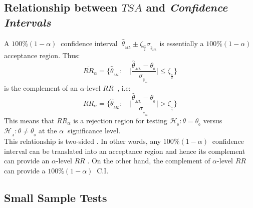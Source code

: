 \documentclass[14pt,twoside,a4paper,fleqn]{article}
\theoremstyle{plain}
\begin{document}
\subsection{Relationship between $TSA$ and \emph{Confidence Intervals}}
A $100\%(1-\alpha)\ $ confidence interval $\ \hat{\theta}_{_{ML}}\pm \zeta_{\frac{\alpha}{2}}\sigma_{_{\hat{\theta}_{ML}}}$ is essentially a $100\%(1-\alpha)\ $ acceptance region. Thus:
$$
	\overline{RR}_\alpha = \big\{ \hat{\theta}_{_{ML}}\colon\ \ \ \  \big| \frac{\hat{\theta}_{_{ML}}-\theta_{_0}}{\sigma_{_{\hat{\theta}_{_{ML}}}}} \big| \leq \zeta_{_{\frac{\alpha}{2}}} \big\}
$$
is the complement of an $\alpha$-level $RR\ $ , i.e:
$$
	{RR}_\alpha = \big\{ \hat{\theta}_{_{ML}}\colon\ \ \ \  \big| \frac{\hat{\theta}_{_{ML}}-\theta_{_0}}{\sigma_{_{\hat{\theta}_{_{ML}}}}} \big| > \zeta_{_{\frac{\alpha}{2}}} \big\}
$$
This means that $RR_\alpha$ is a rejection region for testing $\mathcal{H}_{_0}\colon \theta = \theta_{_0}$ versus \mbox{$\mathcal{H}_{_A}\colon \theta \neq \theta_{_0}$} at the $\alpha\ $ significance level.\\
This relationship is two-sided . In other words, any $100\%(1-\alpha)\ $ confidence interval can be translated into an acceptance region and hence its complement can provide an $\alpha$-level $RR$ . On the other hand, the complement of $\alpha$-level $RR$ can provide a $100\%(1-\alpha)\ $ C.I.
\subsection{Small Sample Tests}
\end{document}
